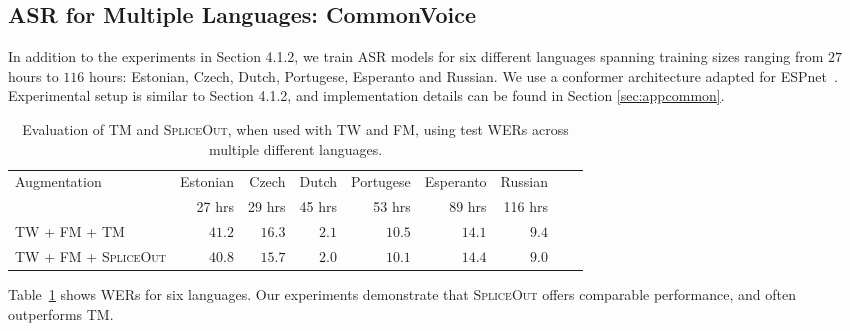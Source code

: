 \documentclass{article}
\newcommand{\SpA}{{\textsc{SpliceOut}}\xspace}
\begin{document}
\subsection{ASR for Multiple Languages: CommonVoice}
In addition to the experiments in Section 4.1.2, we train ASR models for six different languages spanning training sizes ranging from $27$ hours to $116$ hours: Estonian, Czech, Dutch, Portugese, Esperanto and Russian. We use a conformer architecture adapted for ESPnet~\citep{espnetconformer}. Experimental setup is similar to Section 4.1.2, and implementation details can be found in Section \ref{sec:appcommon}. 

\begin{table}[h]
    \centering
    \caption{Evaluation of TM and \SpA, when used with TW and FM, using test WERs across multiple different languages.}
    \begin{tabular}{lrrrrrrrr}
    \toprule
     Augmentation  & Estonian  &  Czech & Dutch & Portugese & Esperanto & Russian\\
      & 27 hrs & 29 hrs & 45 hrs & 53 hrs & 89 hrs & 116 hrs\\ 
    \midrule
    TW + FM + TM~\citep{specaugment,espnet}& $41.2$  & $16.3$ & $2.1$ & $10.5$ & $\mathbf{14.1}$& $9.4$\\
    TW + FM + \SpA & $\mathbf{40.8}$ & $\mathbf{15.7}$ & $\mathbf{2.0}$ & $\mathbf{10.1}$ & $14.4$ & 
      $\mathbf{9.0}$\\
    \bottomrule
    \end{tabular}
    \label{tab:commonvoiceapp}
\end{table}

Table~\ref{tab:commonvoiceapp} shows WERs for six languages. Our experiments demonstrate that \SpA offers comparable performance, and often outperforms TM.
\end{document}
